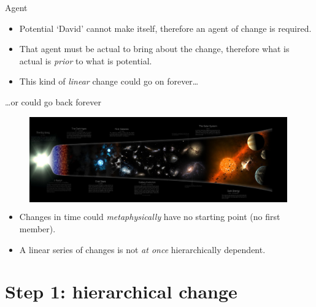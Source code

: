 \documentclass[xcolor=dvipsnames]{beamer}
\begin{document}
\begin{frame}[fragile]{Agent}
  \begin{itemize}
  \item Potential `David' cannot make itself, therefore an agent of change is required. \vspace{5mm}
  \item That agent must be actual to bring about the change, therefore what is actual is \emph{prior} to what is potential. \vspace{5mm}
    \item This kind of \emph{linear} change could go on forever\ldots \vspace{5mm}
  \end{itemize}
\end{frame}

\begin{frame}{\ldots or could go back forever}
\begin{figure}
  \centering
  \begin{columns}
    \centering
    \includegraphics[width=0.99\textwidth]{big_bang}
  \end{columns}
\end{figure}
  \begin{itemize}
  \item Changes in time could \emph{metaphysically} have no starting point (no first member). \vspace{5mm}
  \item A linear series of changes is not \emph{at once} hierarchically dependent. \vspace{5mm}
  \end{itemize}
\end{frame}


\section{Step 1: hierarchical change}
\end{document}
